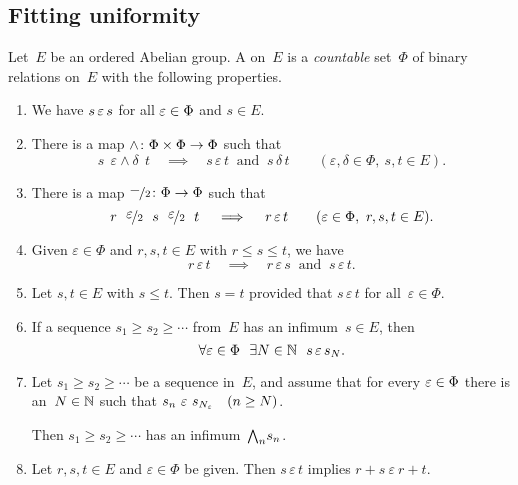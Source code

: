\documentclass[main.tex]{subfiles}
\begin{document}
\subsection{Fitting uniformity}
\label{SS:fitting}
%
%
\begin{dfn}
\label{D:uniformity}
Let~$E$ be an ordered Abelian group.
A  on~$E$
is a \emph{countable} set~$\Phi$ of binary relations on~$E$
with the following properties.
\begin{enumerate}
\item 
\label{E-refl}
We have $s \,\varepsilon\, s$ for all $\varepsilon \in \Phi$ and $s \in E$.
\item
\label{E-min}
There is a map $\wedge\colon \Phi\times\Phi \rightarrow \Phi$
such that
\begin{equation*}
s \ \ \varepsilon\wedge\delta\ \   t
\quad\implies\quad
s \,\varepsilon\,t\ \text{ and }\ s\,\delta\,t
\qquad (\varepsilon,\delta\in\Phi,\ s,t\in E).
\end{equation*}

\item
\label{E-half}
There is a map $\smash{\nicefrac{\textstyle{-}}{2}}\colon \Phi \rightarrow \Phi$
such that
\begin{equation*}
r\ \ \dt\varepsilon \ \ s \ \  \dt\varepsilon \ \ t
\quad\implies\quad
r \se t\qquad(\varepsilon\in\Phi,\ r,s,t\in E).
\end{equation*}

\item \label{E-ord}
Given $\varepsilon\in\Phi$ and $r,s,t\in E$ 
with $r\leq s\leq t$,
we have
\begin{equation*}
r\,\varepsilon\,t
\quad\implies\quad
r\,\varepsilon\,s
\ \text{ and }\ 
s\,\varepsilon\,t.
\end{equation*}

\item \label{E-haus}
Let $s,t\in E$ with $s\leq t$.
Then $s=t$ provided that $s\,\varepsilon\,t$ for all~$\varepsilon\in\Phi$.

\item \label{E-inf-conv}
If a sequence $s_1 \geq s_2 \geq \dotsb$ from~$E$
has an infimum~$s\in E$,
then 
\begin{equation*}
\forall\varepsilon\in \Phi
\ \ \exists N\in \mathbb{N}
\ \ s \, \varepsilon\, s_N.
\end{equation*}

\item  \label{E-bound-inf}
Let $s_1\geq s_2 \geq \dotsb$ be a
sequence in~$E$,
and assume that
for every $\varepsilon\in \Phi$
there is an~$N \in \mathbb{N}$ such that 
$s_{n} \ \varepsilon \ s_{N_\varepsilon}\quad (n\geq N)$.

Then $s_1 \geq s_2 \geq \dotsb$ has an infimum~$\textstyle{\bigwedge}_n s_n$.

\item \label{E-add}
Let $r,s,t\in E$ and $\varepsilon\in\Phi$ be given.
Then $s\,\varepsilon\,t$ implies $r+s\ \varepsilon\ r+t$.
\setcounter{epropc}{\value{enumi}}
\end{enumerate}
\end{dfn}
\end{document}
